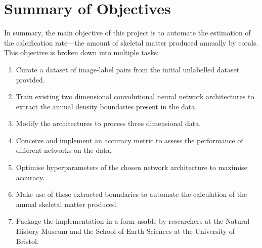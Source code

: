 \section{Summary of Objectives}

In summary, the main objective of this project is to automate the estimation of the calcification rate---the amount of skeletal matter produced annually by corals. This objective is broken down into multiple tasks:

\begin{enumerate}
    \item Curate a dataset of image-label pairs from the initial unlabelled dataset provided.
    \item Train existing two dimensional convolutional neural network architectures to extract the annual density boundaries present in the data.
    \item Modify the architectures to process three dimensional data.
    \item Conceive and implement an accuracy metric to assess the performance of different networks on the data.
    \item Optimise hyperparameters of the chosen network architecture to maximise accuracy.
    \item Make use of these extracted boundaries to automate the calculation of the annual skeletal matter produced.
    \item Package the implementation in a form usable by researchers at the Natural History Museum and the School of Earth Sciences at the University of Bristol.
\end{enumerate}
